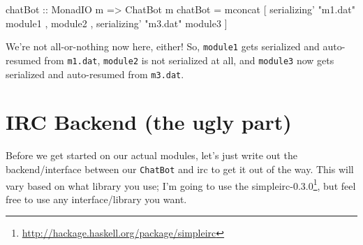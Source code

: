 \documentclass[]{article}
\newenvironment{Shaded}{}{}
\newcommand{\DataTypeTok}[1]{\textcolor[rgb]{0.56,0.13,0.00}{{#1}}}
\newcommand{\StringTok}[1]{\textcolor[rgb]{0.25,0.44,0.63}{{#1}}}
\newcommand{\OtherTok}[1]{\textcolor[rgb]{0.00,0.44,0.13}{{#1}}}
\newcommand{\FunctionTok}[1]{\textcolor[rgb]{0.02,0.16,0.49}{{#1}}}
\newcommand{\NormalTok}[1]{{#1}}
\renewcommand{\href}[2]{#2\footnote{\url{#1}}}
\begin{document}
\begin{Shaded}
\begin{Highlighting}[]
\OtherTok{chatBot ::} \DataTypeTok{MonadIO} \NormalTok{m }\OtherTok{=>} \DataTypeTok{ChatBot} \NormalTok{m}
\NormalTok{chatBot }\FunctionTok{=} \NormalTok{mconcat [ serializing' }\StringTok{"m1.dat"} \NormalTok{module1}
                  \NormalTok{, module2}
                  \NormalTok{, serializing' }\StringTok{"m3.dat"} \NormalTok{module3}
                  \NormalTok{]}
\end{Highlighting}
\end{Shaded}

We're not all-or-nothing now here, either! So, \texttt{module1} gets serialized
and auto-resumed from \texttt{m1.dat}, \texttt{module2} is not serialized at
all, and \texttt{module3} now gets serialized and auto-resumed from
\texttt{m3.dat}.

\section{IRC Backend (the ugly part)}\label{irc-backend-the-ugly-part}

Before we get started on our actual modules, let's just write out the
backend/interface between our \texttt{ChatBot} and irc to get it out of the way.
This will vary based on what library you use; I'm going to use the
\href{http://hackage.haskell.org/package/simpleirc}{simpleirc-0.3.0}, but feel
free to use any interface/library you want.
\end{document}
